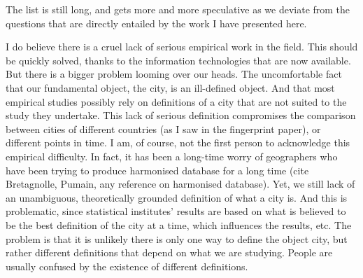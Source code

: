 The list is still long, and gets more and more speculative as we deviate from
the questions that are directly entailed by the work I have presented here.


I do believe there is a cruel lack of serious empirical work in the field. This
should be quickly solved, thanks to the information technologies that are now
available. But there is a bigger problem looming over our heads. The
uncomfortable fact that our fundamental object, the city, is an ill-defined
object. And that most empirical studies possibly rely on definitions of a city
that are not suited to the study they undertake. 
This lack of serious definition compromises the comparison between cities of
different countries (as I saw in the fingerprint paper), or different points in
time. I am, of course, not the first person to acknowledge this empirical
difficulty. In fact, it has been a long-time worry of geographers who have been
trying to produce harmonised database for a long time (cite
Bretagnolle, Pumain, any reference on harmonised database). Yet, we still lack
of an unambiguous, theoretically grounded definition of what a city is. And this
is problematic, since statistical institutes' results are based on what is
believed to be the best definition of the city at a time, which influences the
results, etc.
The problem is that it is unlikely there is only one way to define the object
city, but rather different definitions that depend on what we are studying.
People are usually confused by the existence of different definitions.



